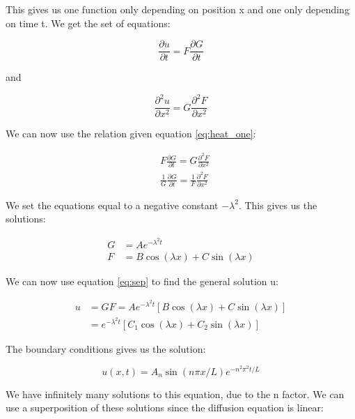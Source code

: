 \documentclass{article}
\begin{document}
This gives us one function only depending on position x and one only depending on time t. We get the set of equations:

\begin{equation*}
\frac{\partial u}{\partial t} = F \frac{\partial G}{\partial t}
\end{equation*}

and

\begin{equation*}
\frac{\partial^2 u}{\partial x^2} = G \frac{\partial^2 F}{\partial x^2}
\end{equation*}

We can now use the relation given equation \ref{eq:heat_one}:

\begin{equation}
\begin{split}
&F\frac{\partial G}{\partial t} = G \frac{\partial ^2 F}{\partial x^2}\\
&\frac{1}{G}\frac{\partial G}{\partial t} = \frac{1}{F} \frac{\partial^2 F}{\partial x^2}
\end{split}
\end{equation}

We set the equations equal to a negative constant $-\lambda^2$. This gives us the solutions:

\begin{equation*}
\begin{split}
G &= Ae^{-\lambda^2 t}\\
F &= B\cos{(\lambda x)} + C\sin{(\lambda x)}
\end{split}
\end{equation*} 

We can now use equation \ref{eq:sep} to find the general solution u:

\begin{equation}
\begin{split}
u &= GF = Ae^{-\lambda^2 t} [B\cos{(\lambda x)} + C\sin{(\lambda x)}]\\
&=e^{-\lambda^2 t} [C_1\cos{(\lambda x)} + C_2\sin{(\lambda x)}]
\end{split}
\end{equation}

The boundary conditions gives us the solution:

\begin{equation}
u(x,t) = A_n\sin{(n\pi x/L)}e^{-n^2\pi^2t/L}
\end{equation}

We have infinitely many solutions to this equation, due to the n factor. We can use a superposition of these solutions since the diffusion equation is linear:
\end{document}
